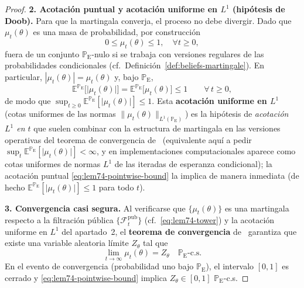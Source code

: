\documentclass[12pt]{article}
\providecommand{\textcite}{\citet}
\theoremstyle{definition}
\theoremstyle{remark}
\newcommand{\E}{\mathbb{E}}
\newcommand{\ProbE}{\mathbb{P}_{\mathrm{E}}}
\newcommand{\1}{\mathbf{1}}
\begin{document}
\begin{proof}
\smallskip
\noindent\textbf{2. Acotación puntual y acotación uniforme en $L^1$ \textup{(}hipótesis de Doob\textup{)}.}
Para que la martingala converja, el proceso no debe divergir. Dado que $\mu_t(\theta)$ es una masa de probabilidad, por construcción
\begin{equation}
\label{eq:lem74-pointwise-bound}
0 \le \mu_t(\theta) \le 1, \quad \forall t \ge 0,
\end{equation}
fuera de un conjunto $\ProbE$-nulo si se trabaja con versiones regulares de las probabilidades condicionales \textup{(}cf.\ Definición~\ref{def:beliefs-martingale}\textup{)}. En particular, $|\mu_t(\theta)|=\mu_t(\theta)$ y, bajo $\ProbE$,
\[
\E^{\ProbE}\bigl[\lvert\mu_t(\theta)\rvert\bigr]=\E^{\ProbE}\bigl[\mu_t(\theta)\bigr]\le 1\qquad \forall\,t\ge 0,
\]
de modo que $\sup_{t\ge 0}\E^{\ProbE}[\lvert\mu_t(\theta)\rvert]\le 1$. Esta \textbf{acotación uniforme en $L^1$} \textup{(}cotas uniformes de las normas $\lVert\mu_t(\theta)\rVert_{L^1(\ProbE)}$\textup{)} es la hipótesis de \emph{acotación $L^1$ en $t$} que suelen combinar con la estructura de martingala en las versiones operativas del teorema de convergencia de~\textcite{Doob1953Stochastic} \textup{(}equivalente aquí a pedir $\sup_t \E^{\ProbE}[\lvert\mu_t(\theta)\rvert]<\infty$, y en implementaciones computacionales aparece como cotas uniformes de normas $L^1$ de las iteradas de esperanza condicional\textup{)}; la acotación puntual \eqref{eq:lem74-pointwise-bound} la implica de manera inmediata \textup{(}de hecho $\E^{\ProbE}[\lvert\mu_t(\theta)\rvert]\le 1$ para todo $t$\textup{)}.

\smallskip
\noindent\textbf{3. Convergencia casi segura.}
Al verificarse que $\{\mu_t(\theta)\}$ es una martingala respecto a la filtración pública $\{\mathcal{F}_t^{\mathrm{pub}}\}$ \textup{(}cf.\ \eqref{eq:lem74-tower}\textup{)} y la acotación uniforme en $L^1$ del apartado~2, el \textbf{teorema de convergencia} de~\textcite{Doob1953Stochastic} garantiza que existe una variable aleatoria límite $Z_\theta$ tal que
\begin{equation}
\label{eq:lem74-as-limit}
\lim_{t \to \infty} \mu_t(\theta) = Z_\theta \quad \ProbE\text{-c.s.}
\end{equation}
En el evento de convergencia \textup{(}probabilidad uno bajo $\ProbE$\textup{)}, el intervalo $[0,1]$ es cerrado y \eqref{eq:lem74-pointwise-bound} implica $Z_\theta\in[0,1]$ $\ProbE$-c.s.
\end{proof}

\end{document}
